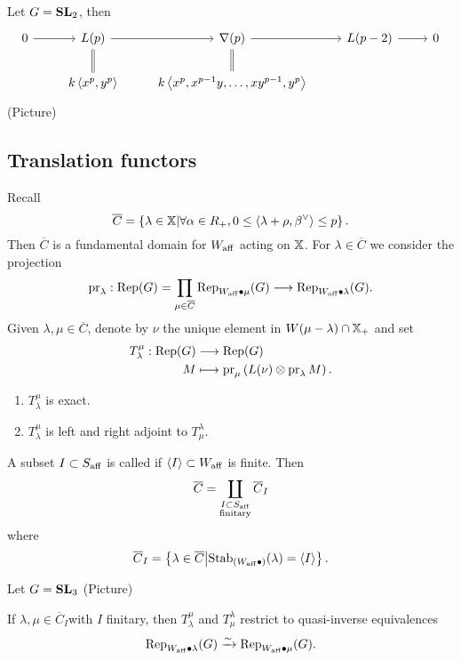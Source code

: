 \begin{example}
	Let $G=\mathbf{SL}_2$, then
	\[
	\begin{tikzcd}
		0 \ar[r] & L(p) \ar[r] \ar[d,equals] & \nabla(p) \ar[r] \ar[d,equals] & L(p-2) \ar[r] & 0 \\
			 & k\left<x^{p},y^{p} \right> & k\left<x^{p},x^{p-1}y,\dots,xy^{p-1},y^{p} \right>
	\end{tikzcd}
	\] 
	(Picture)
\end{example}
\subsection{Translation functors}
Recall
\[
\overline{C} = \left\{ \lambda\in \mathbb{X} \middle| \forall \alpha\in R_+,0\le \left<\lambda+\rho,\beta^{\vee} \right>\le p \right\} .
\] 
Then $\overline{C}$ is a fundamental domain for $W_{\mathrm{aff}}$ acting on $\mathbb{X}$. For $\lambda\in \overline{C}$ we consider the projection
\[
\pr_\lambda:\Rep(G) = \prod_{\mu\in \overline{C}}\Rep_{W\aff\bullet\mu}(G) \to \Rep_{W\aff\bullet\lambda}(G).
\]
Given $\lambda,\mu\in \overline{C}$, denote by $\nu$ the unique element in $W(\mu-\lambda)\cap \mathbb{X}_+$ and set
\begin{align*}
	T_\lambda^{\mu}: \operatorname{Rep}(G) &\longrightarrow \operatorname{Rep}(G) \\
	M &\longmapsto \operatorname{pr}_\mu\left( L(\nu)\otimes\operatorname{pr}_\lambda M \right) .
\end{align*}
\begin{fact}\leavevmode
	\begin{enumerate}[(1)]
		\item $T_\lambda^{\mu}$ is exact.
		\item $T_\lambda^{\mu}$ is left and right adjoint to $T_\mu^{\lambda}$.
	\end{enumerate}
\end{fact}
A subset $I\subset S_{\mathrm{aff}}$ is called  if $\left<I \right>\subset W_{\mathrm{aff}}$ is finite. Then
\[
	\overline{C} = \coprod_{\substack{I\subset S_{\mathrm{aff}} \\ \text{finitary}}} \overline{C}_I
\] 
where
\[
\overline{C}_I = \left\{ \lambda\in \overline{C} \middle| \operatorname{Stab}_{(W_{\mathrm{aff}}\bullet)}(\lambda)=\left<I \right> \right\} .
\] 
\begin{example}
	Let $G=\mathbf{SL}_3$ (Picture)
\end{example}
\begin{theorem}
	If $\lambda,\mu\in \overline{C}_I$with $I$ finitary, then $T_\lambda^{\mu}$ and $T_\mu^{\lambda}$ restrict to quasi-inverse equivalences
	\[
	\operatorname{Rep}_{W_{\mathrm{aff}}\bullet\lambda}(G)\xrightarrow{\sim} \operatorname{Rep}_{W_{\mathrm{aff}}\bullet\mu}(G).
	\] 
\end{theorem}

